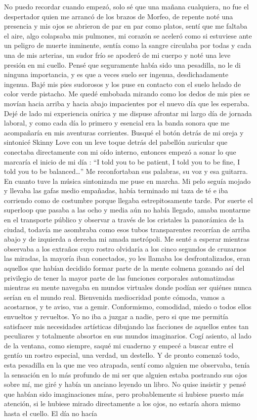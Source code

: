 No puedo recordar cuando empezó, solo sé que una mañana cualquiera, no fue el despertador quien me arrancó de los brazos de Morfeo, de repente noté una presencia y mis ojos se abrieron de par en par como platos, sentí que me faltaba el aire, algo colapsaba mis pulmones, mi corazón se aceleró como si estuviese ante un peligro de muerte inminente, sentía como la sangre circulaba por todas y cada una de mis arterias, un sudor frío se apoderó de mi cuerpo y noté una leve presión en mi cuello. Pensé que seguramente había sido una pesadilla, no le di ninguna importancia, y es que a veces suelo ser ingenua, desdichadamente ingenua. Bajé mis pies sudorosos y los puse en contacto con el suelo helado de color verde pistacho. Me quedé embobada mirando como los dedos de mis pies se movían hacia arriba y hacia abajo  impacientes por el nuevo día que les esperaba. Dejé de lado mi experiencia onírica y me dispuse afrontar mi largo día de jornada laboral, y como cada día lo primero y esencial era la banda sonora que me acompañaría en mis aventuras corrientes. Busqué el botón detrás de mi oreja y sintonicé Skinny Love con un leve toque detrás del pabellón auricular que conectaba directamente con mi oído interno, entonces empezó a sonar lo que marcaría el inicio de mi día : ``I told you to be patient, I told you to be fine, I told you to be balanced…'' Me reconfortaban sus palabras, su voz y esa guitarra. En cuanto tuve la música sintonizada me puse en marcha.  Mi pelo seguía mojado y llevaba las gafas medio empañadas, había terminado mi taza de té e iba corriendo como de costumbre porque llegaba estrepitosamente tarde.  Por suerte el superloop que pasaba a las ocho y media aún no había llegado, amaba montarme en el transporte público y observar a través de los cristales la panorámica de la ciudad, todavía me asombraba como esos tubos transparentes recorrían de arriba abajo y de izquierda a derecha mi amada metrópoli. Me senté a esperar mientras observaba a los extraños cuyo rostro olvidaría a los cinco segundos de cruzarnos las miradas, la mayoría iban conectados, yo les llamaba los desfrontalizados, eran aquellos que habían decidido formar parte de la mente colmena gozando así del privilegio de tener la mayor parte de las funciones corporales automatizadas mientras su mente navegaba en mundos virtuales donde podían ser quiénes nunca serían en el mundo real. Bienvenida mediocridad ponte cómoda, vamos a acostarnos, y te aviso, vas a gemir. Conformismo, comodidad, miedo o todos ellos envueltos y revueltos.  Yo no iba a juzgar a nadie, pero si que me permitía satisfacer mis necesidades artísticas dibujando las facciones de aquellos entes tan peculiares y totalmente absortos en sus mundos imaginarios. Cogí asiento, al lado de la ventana, como siempre, saqué mi cuaderno y empecé a buscar entre el gentío un rostro especial, una verdad, un destello. Y de pronto comenzó todo, esta pesadilla en la que me veo atrapada, sentí como alguien me observaba, tenía la sensación en lo más profundo de mi ser que alguien estaba postrando sus ojos sobre mí, me giré y había un anciano leyendo un libro. No quise insistir y pensé que habían sido imaginaciones mías, pero probablemente si hubiese puesto más atención, si le hubiese mirado directamente a los ojos, no estaría ahora mismo hasta el cuello. El día no hacía 